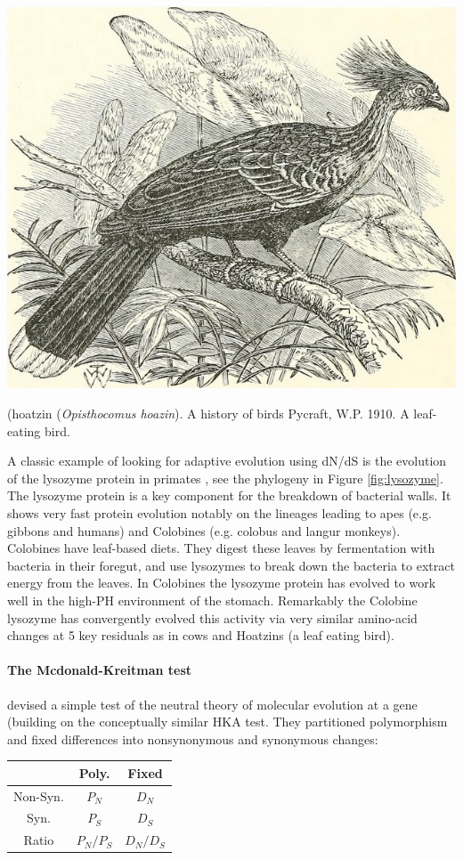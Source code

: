 \begin{marginfigure}
\begin{center}
\includegraphics[width=0.8  \textwidth]{illustration_images/Genetic_drift/Hoatzin/14747388314_85798ba97e_z.jpg}
\end{center}
\caption{ (hoatzin ({\it Opisthocomus hoazin}). A history of birds
  Pycraft, W.P. 1910.  A leaf-eating bird.} \label{fig:hoatzin}  
\end{marginfigure} 
A classic example of looking for adaptive evolution using dN/dS is the
evolution of the lysozyme protein in primates \citep{Messier:97,Yang:98}, see
the phylogeny in Figure \ref{fig:lysozyme}. The lysozyme protein is
a key component for the breakdown of bacterial walls. It shows very
fast protein evolution notably on the lineages leading to apes (e.g. gibbons
and humans) and Colobines (e.g. colobus and langur monkeys). Colobines have leaf-based diets. They digest
these leaves by fermentation with bacteria in their foregut, and use lysozymes to break down the bacteria to extract energy from the
leaves. In Colobines the lysozyme protein has evolved to work well in the high-PH environment of the stomach. Remarkably the Colobine
lysozyme has convergently evolved this activity via very similar
amino-acid changes at 5 key residuals as in cows and Hoatzins (a leaf
eating bird). 

\paragraph{The Mcdonald-Kreitman test}
\citet{mcdonald:91} devised a simple test of the neutral theory of molecular
evolution at a gene (building on the conceptually similar HKA
test\cite{HKA}. They partitioned polymorphism and fixed differences into 
nonsynonymous and synonymous changes:
\begin{center}
\begin{tabular}{ccc}
 & Poly. & Fixed \\
\hline 
Non-Syn. &    $P_N$  &   $D_N$  \\
Syn. &    $P_S$   &     $D_S$   \\
Ratio & $P_N/P_S$ & $D_N/D_S$
\end{tabular}
\end{center}

